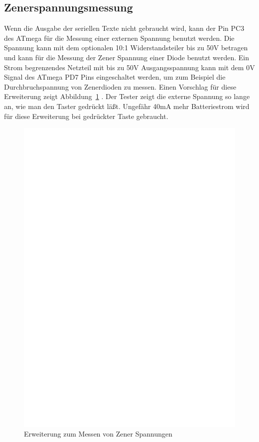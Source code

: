 \subsection{Zenerspannungsmessung}

Wenn die Ausgabe der seriellen Texte nicht gebraucht wird, kann der Pin PC3 des ATmega für die Messung
einer externen Spannung benutzt werden. Die Spannung kann mit dem optionalen 10:1 Widerstandsteiler
bis zu 50V betragen und kann für die Messung der Zener Spannung einer Diode benutzt werden.
Ein Strom begrenzendes Netzteil mit bis zu 50V Ausgangsspannung kann mit dem 0V Signal des ATmega PD7 Pins
eingeschaltet werden, um zum Beispiel die Durchbruchspannung von Zenerdioden zu messen.
Einen Vorschlag für diese Erweiterung zeigt Abbildung~\ref{fig:zener} .
Der Tester zeigt die externe Spannung so lange an, wie man den Taster gedrückt läßt.
Ungefähr 40mA mehr Batteriestrom wird für diese Erweiterung bei gedrückter Taste gebraucht.

\begin{figure}[H]
\centering
\includegraphics[width=18cm]{../FIG/zener_exp.eps}
\caption{Erweiterung zum Messen von Zener Spannungen}
\label{fig:zener}
\end{figure}

